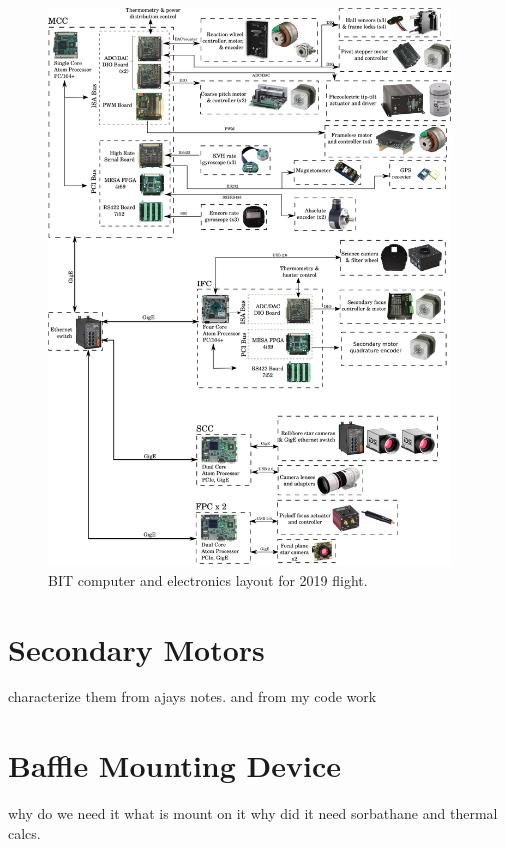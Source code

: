 \begin{figure}
    \begin{small}
        \begin{center}
            \includegraphics[width=0.95\textwidth]{Hardware/figs/electronics.png}
        \end{center}
        \caption{BIT computer and electronics layout for 2019 flight.}
        \label{fig:electronics}
    \end{small}
\end{figure}


\section{Secondary Motors}
characterize them from ajays notes. and from my code work

\section{Baffle Mounting Device}
why do we need it what is mount on it why did it need sorbathane and thermal calcs.

